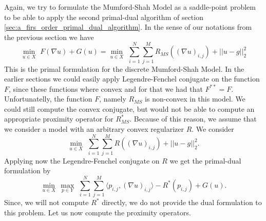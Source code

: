         Again, we try to formulate the Mumford-Shah Model as a saddle-point problem to be able to apply the second primal-dual algorithm of section \ref{sec:a_firs_order_primal_dual_algorithm}. In the sense of our notations from the previous section we have
            \begin{equation}
                \min_{u \in X}\,\, F(\nabla u) + G(u) = \min_{u \in X}\,\, \sum_{i = 1}^{N} \sum_{j = 1}^{M} R_{MS}((\nabla u)_{i,j}) + ||u - g||_{2}^{2}
                \label{eq:primal_mumford_shah_model}
            \end{equation}
        This is the primal formulation for the discrete Mumford-Shah Model. In the earlier sections we could easily apply Legendre-Fenchel conjugate on the function $F$, since these functions where convex and for that we had that $F^{\ast\ast} = F$. Unfortunatelly, the function $F$, namely $R_{MS}$ is non-convex in this model. We could still compute the convex conjugate, but would not be able to compute an appropriate proximity operator for $R_{MS}^{\ast}$. Because of this reason, we assume that we consider a model with an arbitrary convex regularizer $R$. We consider
            \begin{equation}
                \min_{u \in X}\,\, \sum_{i = 1}^{N} \sum_{j = 1}^{M} R((\nabla u)_{i,j}) + ||u - g||_{2}^{2}.
            \end{equation}
        Applying now the Legendre-Fenchel conjugate on $R$ we get the primal-dual formulation by
            $$
                \min_{u \in X}\, \max_{p \in Y}\,\, \sum_{i = 1}^{N} \sum_{j = 1}^{M} \langle p_{i,j}, (\nabla u)_{i,j} \rangle - R^{\ast}(p_{i,j}) + G(u).
            $$
        Since, we will not compute $R^{\ast}$ directly, we do not provide the dual formulation to this problem. Let us now compute the proximity operators.
